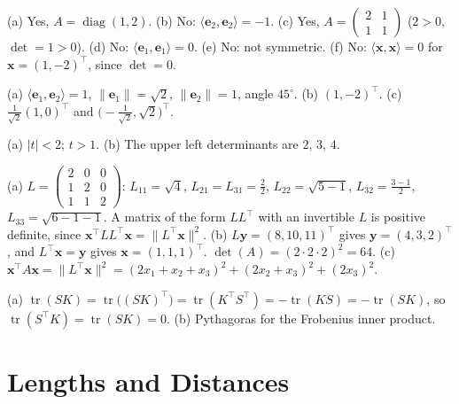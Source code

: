 \documentclass[11pt]{article}
\newcommand{\norm}[1]{\lVert #1 \rVert}
\newcommand{\ip}[2]{\langle #1, #2 \rangle}
\DeclareMathOperator{\tr}{tr}
\DeclareMathOperator{\diag}{diag}
\begin{document}
\begin{description}[leftmargin=0pt, itemsep=0.3em]
    \item[\ref{pr:which-ip}.] (a) Yes, $A = \diag(1, 2)$. (b) No: $\ip{\mathbf{e}_2}{\mathbf{e}_2} = -1$. (c) Yes, $A = \begin{pmatrix} 2 & 1 \\ 1 & 1 \end{pmatrix}$ ($2 > 0$, $\det = 1 > 0$). (d) No: $\ip{\mathbf{e}_1}{\mathbf{e}_1} = 0$. (e) No: not symmetric. (f) No: $\ip{\mathbf{x}}{\mathbf{x}} = 0$ for $\mathbf{x} = (1, -2)^\top$, since $\det = 0$.
    \item[\ref{pr:ip-gram}.] (a) $\ip{\mathbf{e}_1}{\mathbf{e}_2} = 1$, $\norm{\mathbf{e}_1} = \sqrt{2}$, $\norm{\mathbf{e}_2} = 1$, angle $45^\circ$. (b) $(1, -2)^\top$. (c) $\frac{1}{\sqrt{2}}(1, 0)^\top$ and $\big(-\frac{1}{\sqrt{2}}, \sqrt{2}\big)^\top$.
    \item[\ref{pr:spd-param}.] (a) $|t| < 2$; $t > 1$. (b) The upper left determinants are $2$, $3$, $4$.
    \item[\ref{pr:cholesky}.] (a) $L = \begin{pmatrix} 2 & 0 & 0 \\ 1 & 2 & 0 \\ 1 & 1 & 2 \end{pmatrix}$: $L_{11} = \sqrt{4}$, $L_{21} = L_{31} = \frac{2}{2}$, $L_{22} = \sqrt{5 - 1}$, $L_{32} = \frac{3 - 1}{2}$, $L_{33} = \sqrt{6 - 1 - 1}$. A matrix of the form $LL^\top$ with an invertible $L$ is positive definite, since $\mathbf{x}^\top LL^\top\mathbf{x} = \norm{L^\top\mathbf{x}}^2$. (b) $L\mathbf{y} = (8, 10, 11)^\top$ gives $\mathbf{y} = (4, 3, 2)^\top$, and $L^\top\mathbf{x} = \mathbf{y}$ gives $\mathbf{x} = (1, 1, 1)^\top$. $\det(A) = (2 \cdot 2 \cdot 2)^2 = 64$. (c) $\mathbf{x}^\top A\mathbf{x} = \norm{L^\top\mathbf{x}}^2 = (2x_1 + x_2 + x_3)^2 + (2x_2 + x_3)^2 + (2x_3)^2$.
    \item[\ref{pr:frobenius-ip}.] (a) $\tr(SK) = \tr\big((SK)^\top\big) = \tr(K^\top S^\top) = -\tr(KS) = -\tr(SK)$, so$\tr(S^\top K) = \tr(SK) = 0$. (b) Pythagoras for the Frobenius inner product.
\end{description}

\section*{Lengths and Distances}
\end{document}
